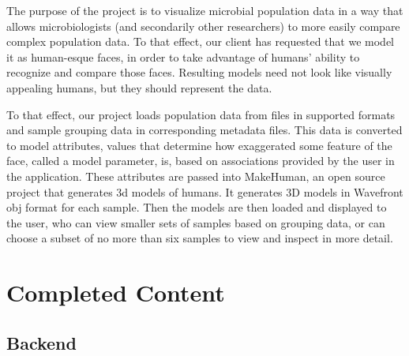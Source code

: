 \documentclass[letterpaper,10pt, onecolumn, draftclsnofoot]{IEEEtran}
\begin{document}
The purpose of the project is to visualize microbial population data in a way that allows microbiologists (and secondarily other researchers) to more easily compare complex population data. To that effect, our client has requested that we model it as human-esque faces, in order to take advantage of humans' ability to recognize and compare those faces. Resulting models need not look like visually appealing humans, but they should represent the data.

To that effect, our project loads population data from files in supported formats and sample grouping data in corresponding metadata files. This data is converted to model attributes, values that determine how exaggerated some feature of the face, called a model parameter, is, based on associations provided by the user in the application. These attributes are passed into MakeHuman, an open source project that generates 3d models of humans. It generates 3D models in Wavefront obj format for each sample. Then the models are then loaded and displayed to the user, who can view smaller sets of samples based on grouping data, or can choose a subset of no more than six samples to view and inspect in more detail.

\section{Completed Content}

\subsection{Backend}
\end{document}
